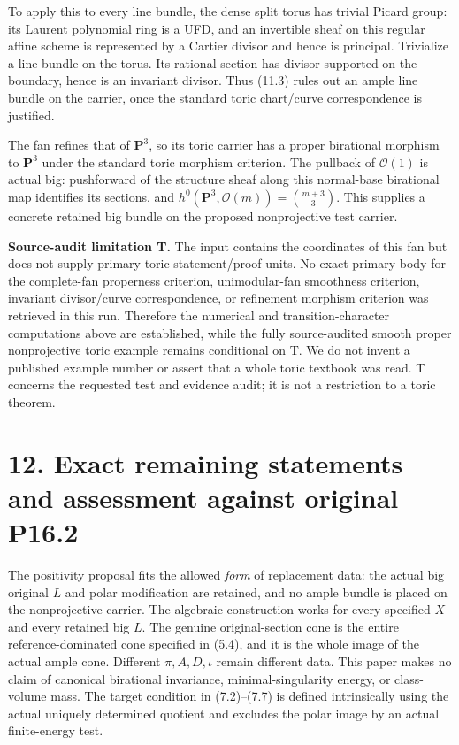 \documentclass[
  10pt,
]{article}
\begin{document}
To apply this to every line bundle, the dense split torus has trivial
Picard group: its Laurent polynomial ring is a UFD, and an invertible
sheaf on this regular affine scheme is represented by a Cartier divisor
and hence is principal. Trivialize a line bundle on the torus. Its
rational section has divisor supported on the boundary, hence is an
invariant divisor. Thus (11.3) rules out an ample line bundle on the
carrier, once the standard toric chart/curve correspondence is
justified.

The fan refines that of \(\mathbf P^3\), so its toric carrier has a
proper birational morphism to \(\mathbf P^3\) under the standard toric
morphism criterion. The pullback of \(\mathcal O(1)\) is actual big:
pushforward of the structure sheaf along this normal-base birational map
identifies its sections, and
\(h^0(\mathbf P^3,\mathcal O(m))=\binom{m+3}{3}\). This supplies a
concrete retained big bundle on the proposed nonprojective test carrier.

\textbf{Source-audit limitation T.} The input contains the coordinates
of this fan but does not supply primary toric statement/proof units. No
exact primary body for the complete-fan properness criterion,
unimodular-fan smoothness criterion, invariant divisor/curve
correspondence, or refinement morphism criterion was retrieved in this
run. Therefore the numerical and transition-character computations above
are established, while the fully source-audited smooth proper
nonprojective toric example remains conditional on T. We do not invent a
published example number or assert that a whole toric textbook was read.
T concerns the requested test and evidence audit; it is not a
restriction to a toric theorem.

\section{12. Exact remaining statements and assessment against original
P16.2}\label{exact-remaining-statements-and-assessment-against-original-p16.2}

The positivity proposal fits the allowed \emph{form} of replacement
data: the actual big original \(L\) and polar modification are retained,
and no ample bundle is placed on the nonprojective carrier. The
algebraic construction works for every specified \(X\) and every
retained big \(L\). The genuine original-section cone is the entire
reference-dominated cone specified in (5.4), and it is the whole image
of the actual ample cone. Different \(\pi,A,D,\iota\) remain different
data. This paper makes no claim of canonical birational invariance,
minimal-singularity energy, or class-volume mass. The target condition
in (7.2)--(7.7) is defined intrinsically using the actual uniquely
determined quotient and excludes the polar image by an actual
finite-energy test.
\end{document}
